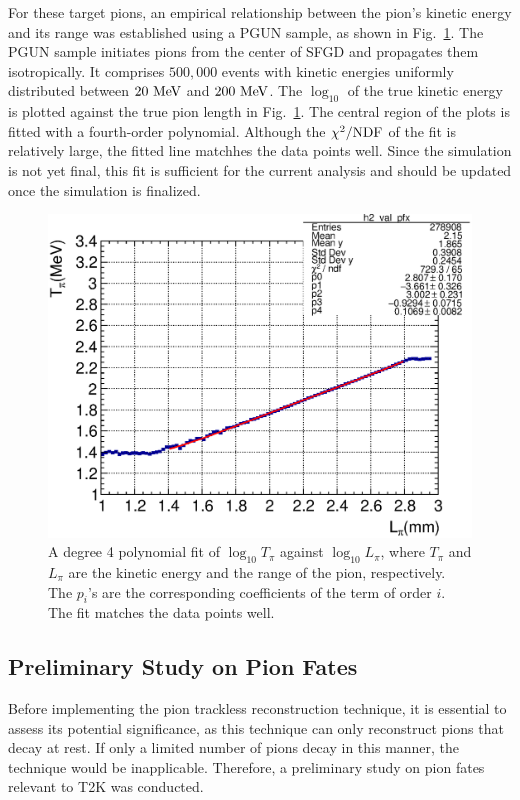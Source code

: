          For these target pions, an empirical relationship between the pion's kinetic energy and its range was established using a PGUN sample, as shown in Fig.~\ref{fig:pi-mombr-fit}. 
          The PGUN sample initiates pions from the center of SFGD and propagates them isotropically. 
          It comprises $500,000$ events with kinetic energies uniformly distributed between $20~\textrm{MeV}$ and $200~\textrm{MeV}$. 
          The $\log_{10}$ of the true kinetic energy is plotted against the true pion length in Fig.~\ref{fig:pi-mombr-fit}.
          The central region of the plots is fitted with a fourth-order polynomial.
          Although the $\chi^2/{\textrm{NDF}}$ of the fit is relatively large, the fitted line matchhes the data points well.
          Since the simulation is not yet final, this fit is sufficient for the current analysis and should be updated once the simulation is finalized.
          \begin{figure}[h]
          \centering
          \includegraphics[width=\sgfidwid\textwidth]{figures/sel/pi_len_pi_len_vs_pi_ke_hist2d_al0_true_nokink.eps} 
          \caption{A degree 4 polynomial fit of $\log_{10}{T_\pi}$ against $\log_{10}{L_\pi}$, where $T_\pi$ and $L_\pi$ are the kinetic energy and the range of the pion, respectively. The $p_i$'s are the corresponding coefficients of the term of order $i$. The fit matches the data points well.}
          \label{fig:pi-mombr-fit}
          \end{figure}

       \subsection{Preliminary Study on Pion Fates}
       \label{sec:tl-ps}
          Before implementing the pion trackless reconstruction technique, it is essential to assess its potential significance, as this technique can only reconstruct pions that decay at rest. 
          If only a limited number of pions decay in this manner, the technique would be inapplicable. 
          Therefore, a preliminary study on pion fates relevant to T2K was conducted.

